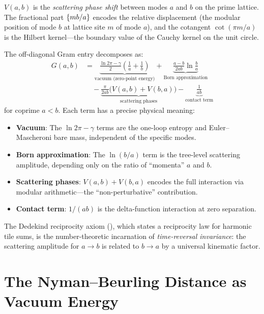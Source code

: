 \documentclass[11pt,a4paper]{article}
\begin{document}
\begin{correspondence}
$V(a,b)$ is the \emph{scattering phase shift} between modes
$a$ and $b$ on the prime lattice. The fractional part
$\{mb/a\}$ encodes the relative displacement (the modular
position of mode $b$ at lattice site $m$ of mode $a$), and the
cotangent $\cot(\pi m/a)$ is the Hilbert kernel---the boundary
value of the Cauchy kernel on the unit circle.

The off-diagonal Gram entry decomposes as:
\begin{align}
  G(a,b) &= \underbrace{\frac{\ln 2\pi - \gamma}{2}\left(\frac{1}{a}+\frac{1}{b}\right)}_{\text{vacuum (zero-point energy)}}
  + \underbrace{\frac{a-b}{2ab}\ln\frac{b}{a}}_{\text{Born approximation}}
  \nonumber \\
  &\quad - \underbrace{\frac{\pi}{2ab}\bigl(V(a,b) + V(b,a)\bigr)}_{\text{scattering phases}}
  - \underbrace{\frac{1}{ab}}_{\text{contact term}}
\end{align}
for coprime $a < b$.
Each term has a precise physical meaning:
\begin{itemize}
  \item \textbf{Vacuum}: The $\ln 2\pi - \gamma$ terms are the
    one-loop entropy and Euler--Mascheroni bare mass, independent of
    the specific modes.
  \item \textbf{Born approximation}: The $\ln(b/a)$ term is the
    tree-level scattering amplitude, depending only on the ratio of
    ``momenta'' $a$ and $b$.
  \item \textbf{Scattering phases}: $V(a,b) + V(b,a)$ encodes the
    full interaction via modular arithmetic---the ``non-perturbative''
    contribution.
  \item \textbf{Contact term}: $1/(ab)$ is the delta-function
    interaction at zero separation.
\end{itemize}
\end{correspondence}

The Dedekind reciprocity axiom (),
which states a reciprocity law for harmonic tile sums, is the number-theoretic
incarnation of \emph{time-reversal invariance}: the scattering amplitude
for $a \to b$ is related to $b \to a$ by a universal kinematic factor.

\section{The Nyman--Beurling Distance as Vacuum Energy}
\label{sec:vacuum}
\end{document}
